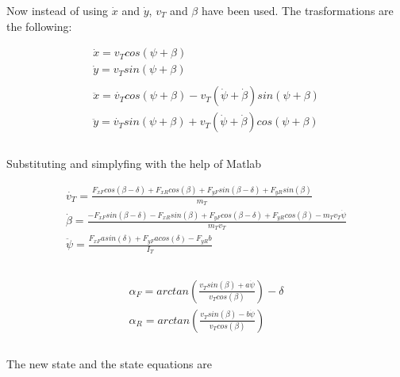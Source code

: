 \documentclass{report}
\begin{document}
Now instead of using $\dot{x}$ and $\dot{y}$, $v_T$ and $\beta$ have been used. The trasformations are the following: 

\begin{equation}
\begin{aligned}
\dot{x} = v_T cos(\psi + \beta)\\
\dot{y} = v_T sin(\psi + \beta)\\\\
\ddot{x} = \dot{v_T} cos(\psi + \beta) - v_T (\dot{\psi} + \dot{\beta}) sin(\psi + \beta)\\
\ddot{y} = \dot{v_T} sin(\psi + \beta) + v_T (\dot{\psi} + \dot{\beta}) cos(\psi + \beta)\\\\
\end{aligned}
\end{equation}

Substituting and simplyfing with the help of Matlab

\begin{equation}
\begin{aligned}
\dot{v_T} = \frac{F_{xF} cos(\beta-\delta) + F_{xR} cos(\beta) + F_{yF} sin(\beta-\delta) + F_{yR} sin(\beta)}{m_T} \\
\dot{\beta} = \frac{-F_{xF} sin(\beta-\delta) - F_{xR} sin(\beta) + F_{yF} cos(\beta-\delta) + F_{yR} cos(\beta) - m_T v_T \dot{\psi}}{m_T v_T} \\
\ddot{\psi} = \frac{F_{xF} a sin(\delta) + F_{yF} a cos(\delta) - F_{yR} b}{I_T} \\\\
\end{aligned}
\end{equation}

\begin{equation}
\begin{aligned}
\alpha_F = arctan(\frac{v_T sin(\beta) + a\dot{\psi}}{v_T cos(\beta)}) - \delta\\
\alpha_R = arctan(\frac{v_T sin(\beta) - b\dot{\psi}}{v_T cos(\beta)}) \\\\
\end{aligned}
\end{equation}

The new state and the state equations are
\end{document}
